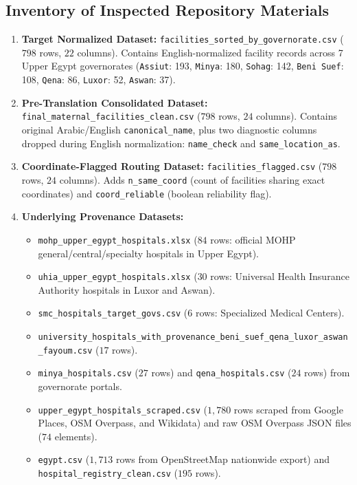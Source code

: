 \documentclass[10pt,a4paper]{article}
\begin{document}
\subsection{Inventory of Inspected Repository Materials}
\begin{enumerate}
    \item \textbf{Target Normalized Dataset:} \texttt{facilities\_sorted\_by\_governorate.csv} ($798$ rows, $22$ columns). Contains English-normalized facility records across 7 Upper Egypt governorates (\texttt{Assiut}: 193, \texttt{Minya}: 180, \texttt{Sohag}: 142, \texttt{Beni Suef}: 108, \texttt{Qena}: 86, \texttt{Luxor}: 52, \texttt{Aswan}: 37).
    \item \textbf{Pre-Translation Consolidated Dataset:} \texttt{final\_maternal\_facilities\_clean.csv} ($798$ rows, $24$ columns). Contains original Arabic/English \texttt{canonical\_name}, plus two diagnostic columns dropped during English normalization: \texttt{name\_check} and \texttt{same\_location\_as}.
    \item \textbf{Coordinate-Flagged Routing Dataset:} \texttt{facilities\_flagged.csv} ($798$ rows, $24$ columns). Adds \texttt{n\_same\_coord} (count of facilities sharing exact coordinates) and \texttt{coord\_reliable} (boolean reliability flag).
    \item \textbf{Underlying Provenance Datasets:}
    \begin{itemize}
        \item \texttt{mohp\_upper\_egypt\_hospitals.xlsx} ($84$ rows: official MOHP general/central/specialty hospitals in Upper Egypt).
        \item \texttt{uhia\_upper\_egypt\_hospitals.xlsx} ($30$ rows: Universal Health Insurance Authority hospitals in Luxor and Aswan).
        \item \texttt{smc\_hospitals\_target\_govs.csv} ($6$ rows: Specialized Medical Centers).
        \item \texttt{university\_hospitals\_with\_provenance\_beni\_suef\_qena\_luxor\_aswan\_fayoum.csv} ($17$ rows).
        \item \texttt{minya\_hospitals.csv} ($27$ rows) and \texttt{qena\_hospitals.csv} ($24$ rows) from governorate portals.
        \item \texttt{upper\_egypt\_hospitals\_scraped.csv} ($1,780$ rows scraped from Google Places, OSM Overpass, and Wikidata) and raw OSM Overpass JSON files ($74$ elements).
        \item \texttt{egypt.csv} ($1,713$ rows from OpenStreetMap nationwide export) and \texttt{hospital\_registry\_clean.csv} ($195$ rows).

\end{itemize}
\end{enumerate}
\end{document}
